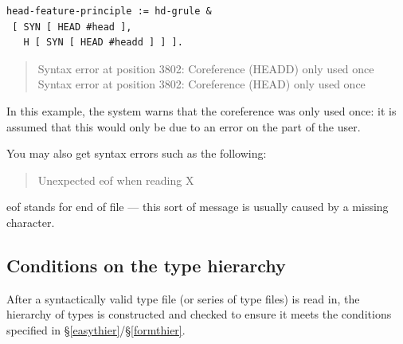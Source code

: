 \documentclass[12pt]{report}
\newenvironment{error}%
{\begin{quote}
\tt
}%
{\end{quote}
}
\begin{document}
\begin{verbatim}
head-feature-principle := hd-grule & 
 [ SYN [ HEAD #head ],
   H [ SYN [ HEAD #headd ] ] ].
\end{verbatim}
\begin{error}
Syntax error at position 3802: Coreference (HEADD) only used once
Syntax error at position 3802: Coreference (HEAD) only used once
\end{error}
In this example, the system warns that the coreference was only used 
once: it is assumed that this would only be due to an error on the part of 
the user.

You may also get syntax errors such as the following:
\begin{error}
Unexpected eof when reading X
\end{error}
eof stands for end of file --- this sort of message is usually 
caused by a missing character.

\subsection{Conditions on the type hierarchy}
After a syntactically valid type file (or series of type files)
is read in, the hierarchy of types is constructed and checked 
to ensure it meets the conditions specified in \S\ref{easythier}/\S\ref{formthier}.
\end{document}

